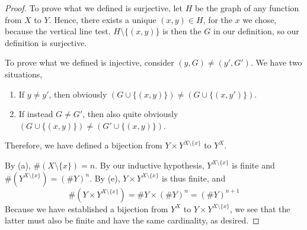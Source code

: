 \begin{proof}
	To prove what we defined is surjective, let $H$ be the graph of any function from $X$ to $Y$. Hence, there exists a unique $(x,y) \in H$, for the $x$ we chose, because the vertical line test. $H \setminus \{(x,y)\}$ is then the $G$ in our definition, so our definition is surjective.
	
	To prove what we defined is injective, consider $(y,G) \ne (y',G')$. We have two situations,
	\begin{enumerate}
		\item If $y \ne y'$, then obviously $(G \cup \{(x,y)\}) \ne (G \cup \{(x,y')\})$.
		\item If instead $G \ne G'$, then also quite obviously $(G \cup \{(x,y)\}) \ne (G' \cup \{(x,y)\})$.
	\end{enumerate}

	Therefore, we have defined a bijection from $Y \times Y^{X \setminus \{x\}}$ to $Y^X$.
	
	By (a), $\#(X \setminus \{x\}) = n$. By our inductive hypothesis, $Y^{X \setminus \{x\}}$ is finite and $\#(Y^{X \setminus \{x\}}) = (\#Y)^n$. By (e), $Y \times Y^{X \setminus \{x\}}$ is thus finite, and
	\[
		\#(Y \times Y^{X \setminus \{x\}}) = \#Y \times (\#Y)^n = (\#Y)^{n+1}
	\]
	Because we have established a bijection from $Y^X$ to $Y \times Y^{X \setminus \{x\}}$, we see that the latter must also be finite and have the same cardinality, as desired.
\end{proof}

